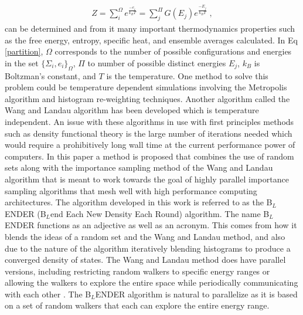\documentclass[aps,prl,reprint,superscriptaddress,showkeys]{revtex4-1}
\begin{document}
\begin{equation}
\begin{split}
Z = \sum_{i}^{\Omega}e^{\frac{-e_i}{k_B T} }= \sum_{j}^{\Pi}G(E_j)e^{\frac{-E_j}{k_BT}} \;,
\end{split}
\label{partition}
\end{equation}
can be  determined and from it many important thermodynamics properties such as the free energy, entropy, specific heat, and ensemble averages calculated. In Eq \ref{partition}, $\Omega$ corresponds to the number of possible configurations and energies in the set $\{\Sigma_i,e_i\}_\Omega$, $\Pi$ to number of possible distinct energies $E_j$, $k_B$ is Boltzman's constant, and $T$ is the temperature. One method to solve this problem could be temperature dependent simulations involving the  Metropolis algorithm and histogram re-weighting techniques\cite{metropolis_equation_1953, landau_MC_simulations}.   Another algorithm called the  Wang and Landau algorithm\cite{WL_phys_rev_lett} has been developed which is temperature independent. An issue with these algorithms in use with first principles methods such as density functional theory is the large number of iterations needed which would require a prohibitively long wall time at the current performance power of computers.  In this paper a method is proposed that combines the use of random sets along with the importance sampling method of the Wang and Landau algorithm that is meant to work towards the goal of highly parallel importance sampling algorithms that mesh well with high performance computing architectures. The algorithm developed in this work is referred to as the B$_{L}$ENDER (B$_{L}$end Each New Density Each Round) algorithm. The name B$_{L}$ENDER functions as an  adjective as well as an acronym. This comes from how it blends the ideas of a random set and the Wang and Landau method, and also due to the nature of the algorithm iteratively blending histograms to produce a converged density of states.  The Wang and Landau method does have parallel versions, including  restricting random walkers to specific energy ranges or allowing the walkers to explore the entire space while periodically communicating with each other \cite{MP_Wang_Landau,P_imp_Wang_Landau, Hframe_Wang_Landau}.  The B$_{L}$ENDER algorithm is natural to parallelize as it is based on a set of random walkers that each can explore the entire energy range. 
\end{document}
